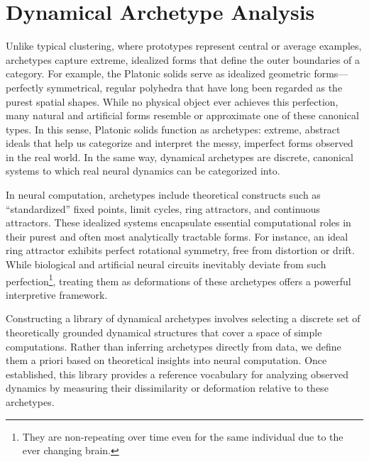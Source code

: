 \documentclass{article}
\theoremstyle{definition} \newtheorem{definition}{Definition}  \newtheorem{example}{Example}
\theoremstyle{remark} \newtheorem{remark}{Remark}
\newcounter{ct}
\begin{document}
\section{Dynamical Archetype Analysis}\label{sec:dmm}\label{sec:daa}
Unlike typical clustering, where prototypes represent central or average examples, archetypes capture extreme, idealized forms that define the outer boundaries of a category. For example, the Platonic solids serve as idealized geometric forms—perfectly symmetrical, regular polyhedra that have long been regarded as the purest spatial shapes. While no physical object ever achieves this perfection, many natural and artificial forms resemble or approximate one of these canonical types. In this sense, Platonic solids function as archetypes: extreme, abstract ideals that help us categorize and interpret the messy, imperfect forms observed in the real world.  In the same way, dynamical archetypes are discrete, canonical systems to which real neural dynamics can be categorized into.

In neural computation, archetypes include theoretical constructs such as ``standardized'' fixed points, limit cycles, ring attractors, and continuous attractors\citep{sussillo2013blackbox, katz2017fibers, golub2018fixedpointfinder,townley2000existence, pals2024inferring}. These idealized systems encapsulate essential computational roles in their purest and often most analytically tractable forms. For instance, an ideal ring attractor exhibits perfect rotational symmetry, free from distortion or drift. While biological and artificial neural circuits inevitably deviate from such perfection\footnote{They are non-repeating over time even for the same individual due to the ever changing brain\citep{chirimuuta2024brain}.}\citep{panichello2019error}, treating them as deformations of these archetypes offers a powerful interpretive framework.

Constructing a library of dynamical archetypes involves selecting a discrete set of theoretically grounded dynamical structures that cover a space of simple computations. Rather than inferring archetypes directly from data, we define them a priori based on theoretical insights into neural computation. Once established, this library provides a reference vocabulary for analyzing observed dynamics by measuring their dissimilarity or deformation relative to these archetypes.
\end{document}

